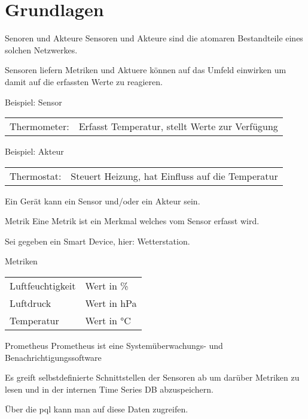 \documentclass[12pt, pdf, xcolor={table, dvipsnames}, paperheight=8cm,paperwidth=12cm]{beamer}
\begin{document}
\section{Grundlagen}

\begin{frame}{Senoren und Akteure}
	Sensoren und Akteure sind die atomaren Bestandteile eines solchen Netzwerkes.
	
	\vspace{1em}
	Sensoren liefern Metriken und Aktuere können auf das Umfeld einwirken um damit auf die erfassten Werte zu reagieren.
	\begin{block}{Beispiel: Sensor}
		\vspace{0.5em}
		\begin{tabularx}{\linewidth}{lX}Thermometer: & Erfasst Temperatur, stellt Werte zur  Verfügung
		\end{tabularx}
	\end{block}
	\begin{block}{Beispiel: Akteur}
	\vspace{0.5em}
	\begin{tabularx}{\linewidth}{lX}Thermostat: &Steuert Heizung, hat Einfluss auf die Temperatur
	\end{tabularx}
	\end{block}
Ein Gerät kann ein Sensor und/oder ein Akteur sein.
\end{frame}

\begin{frame}{Metrik}
	Eine Metrik ist ein Merkmal welches vom Sensor erfasst wird.
	
	\vspace{1em}
	Sei gegeben ein Smart Device, hier: Wetterstation.
	
	\vspace{1em}
	\begin{block}{Metriken}
		\vspace{.5em}
		\begin{tabularx}{\linewidth}{lX}
			Luftfeuchtigkeit & Wert in \%\\
			Luftdruck & Wert in hPa\\
			Temperatur & Wert in °C\\
		\end{tabularx}
	\end{block}
\end{frame}

\begin{frame}{Prometheus}
	Prometheus ist eine Systemüberwachungs- und Benachrichtigungssoftware
	
	Es greift selbstdefinierte Schnittstellen der Sensoren ab um darüber Metriken zu lesen und in der internen Time Series DB abzuspeichern.
	
	Über die \gls{pql} kann man auf diese Daten zugreifen.
\end{frame}
\end{document}
